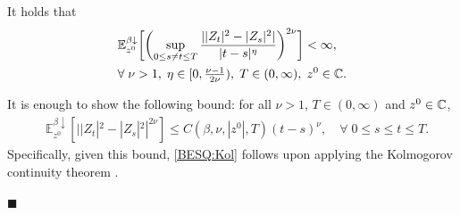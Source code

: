 \documentclass[12pt, twoside]{article}
\numberwithin{figure}{section}
\newcommand{\1}{\mathds 1}
\newcommand{\da}{{\downarrow}}
\newcommand{\E}{{\mathbb E}}
\newcommand{\2}{{\mathbf 1}}
\renewenvironment{proof}[1][\proofname]{\noindent {\bfseries #1.}\;}{\hfill\ensuremath{\blacksquare}\\}
\begin{document}
\begin{lem}\label{lem:regularity}
It holds that 
\begin{align}\label{BESQ:Kol}
\begin{split}
&\E_{z^0}^{\beta\da}\biggl[\biggl(\sup_{ 0\leq s\neq t\leq T}\frac{||Z_t|^2-|Z_s|^2|}{|t-s|^{\eta}}\biggr)^{2\nu}\biggr]<\infty,\\&\forall\;\nu>1,\;\eta\in [0,\tfrac{\nu-1}{2\nu}),\; T\in (0,\infty),\;z^0\in \Bbb C.\end{split}
\end{align}
\end{lem}
\begin{proof}
It is enough to show the following bound: for all $\nu>1$, $T\in (0,\infty)$ and $z^0\in \Bbb C$,
\begin{align}
&\E_{z^0}^{\beta\da}[||Z_t|^2-|Z_s|^2|^{2\nu}]\leq C(\beta,\nu,|z^0|,T)(t-s)^\nu,\quad \forall\;0\leq s\leq t\leq T.\label{regularity0}
\end{align}
Specifically, given this bound, \eqref{BESQ:Kol} follows upon applying the Kolmogorov continuity theorem \cite[(2.1) Theorem, p.26]{RY}. 


\end{proof}
\end{document}
